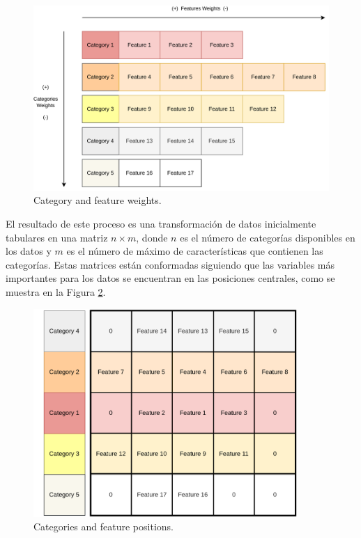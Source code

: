 \documentclass{uathesis-es}
\begin{document}
\begin{figure}[H]
    \centering
    \includegraphics[width=14cm]{Figures/indexing_positions_1_2.png}
    \caption{Category and feature weights.}
    \label{CategoriesFeaturesWeights}
\end{figure}

El resultado de este proceso es una transformación de datos inicialmente tabulares en una matriz $n \times m$, donde $n$ es el número de categorías disponibles en los datos y $m$ es el número de máximo de características que contienen las categorías. Estas matrices están conformadas siguiendo que las variables más importantes para los datos se encuentran en las posiciones centrales, como se muestra en la Figura \ref{MatrixIndexes}.


\begin{figure}[H]
    \centering
    \includegraphics[width=10cm]{Figures/indexing_positions_2.png}
    \caption{Categories and feature positions.}
    \label{MatrixIndexes}
\end{figure}
\end{document}
